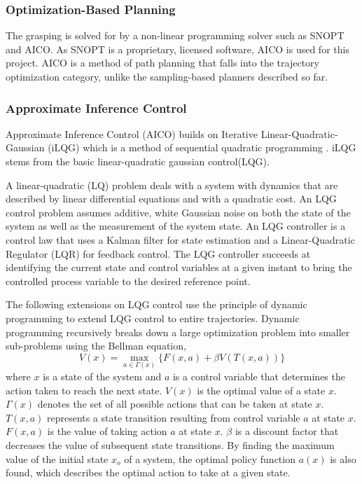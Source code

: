 \documentclass[11pt]{article}
\begin{document}
        \subsubsection{Optimization-Based Planning}
            The grasping is solved for by a non-linear programming solver such as SNOPT and AICO. As SNOPT is a proprietary, licensed software, AICO is used for this project. AICO is a method of path planning that falls into the trajectory optimization category, unlike the sampling-based planners described so far.

        \subsubsection{Approximate Inference Control}
            Approximate Inference Control (AICO) \cite{toussaint_robot_2009} builds on Iterative Linear-Quadratic-Gaussian (iLQG) which is a method of sequential quadratic programming \cite{todorov_generalized_2005}. iLQG stems from the basic linear-quadratic gaussian control(LQG).

            \par A linear-quadratic (LQ) problem deals with a system with dynamics that are described by linear differential equations and with a quadratic cost. An LQG control problem assumes additive, white Gaussian noise on both the state of the system as well as the measurement of the system state. An LQG controller is a control law that uses a Kalman filter for state estimation and a Linear-Quadratic Regulator (LQR) for feedback control. The LQG controller succeeds at identifying the current state and control variables at a given instant to bring the controlled process variable to the desired reference point.

            The following extensions on LQG control use the principle of dynamic programming to extend LQG control to entire trajectories. Dynamic programming recursively breaks down a large optimization problem into smaller sub-problems using the Bellman equation,
            \begin{equation}
                V(x)=\max_{a \in \Gamma (x)}\{F(x,a)+\beta V(T(x,a))\}
            \end{equation}
            where $x$ is a state of the system and $a$ is a control variable that determines the action taken to reach the next state. $V(x)$ is the optimal value of a state $x$. $\Gamma(x)$ denotes the set of all possible actions that can be taken at state $x$. $T(x,a)$ represents a state transition resulting from control variable $a$ at state $x$. $F(x,a)$ is the value of taking action $a$ at state $x$. $\beta$ is a discount factor that decreases the value of subsequent state transitions. By finding the maximum value of the initial state $x_{o}$ of a system, the optimal policy function $a(x)$ is also found, which describes the optimal action to take at a given state.
\end{document}
